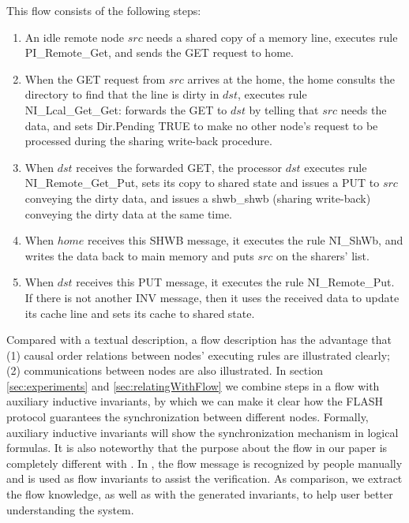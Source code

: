 \documentclass{llncs-new}
\newcommand{\lvyi}[1]{{\color{blue}#1}}
\begin{document}
This flow consists of the following steps:
\begin{enumerate}
\item An idle remote node $src$ needs a shared copy of a memory line, executes   rule PI\_Remote\_Get, and  sends the GET request to home.

\item  When the GET request from $src$ arrives at the
home, the home consults the directory to find that the line is dirty in $dst$,  executes rule NI\_Lcal\_Get\_Get: forwards the GET to $dst$ by telling that $src$ needs the data, and sets Dir.Pending TRUE to make no  other node's request to be processed during the sharing write-back procedure.

\item  When $dst$ receives the forwarded GET, the
processor $dst$ executes rule \\
NI\_Remote\_Get\_Put, sets its copy to shared state and issues a PUT to $src$ conveying the dirty data,  and  issues a   shwb\_shwb
 (sharing write-back) conveying the dirty data at the same time.

\item   When $home$ receives this SHWB message, it executes the rule NI\_ShWb, and
 writes the
data back  to main memory and puts $src$ on the sharers' list.

\item When $dst$ receives this PUT message, it executes the rule NI\_Remote\_Put. If there is not another INV message, then it   uses the received data to update its cache line and sets its cache to shared state.


\end{enumerate}

Compared with a textual description, a flow description has the advantage that (1) causal order relations between nodes' executing rules are illustrated clearly; (2) communications between nodes are also illustrated. In section \ref{sec:experiments} and \ref{sec:relatingWithFlow} we combine steps in a flow with auxiliary inductive invariants, by which we can make it clear  how the FLASH protocol guarantees the synchronization between different nodes. Formally, auxiliary inductive invariants will show    the synchronization mechanism in logical formulas. It is also noteworthy that the purpose about the flow in our paper is completely different with \cite{Talupur2008a}. In \cite{Talupur2008a}, the flow message is recognized by people manually and is used as flow invariants to assist the verification. As comparison, we extract the flow knowledge, as well as with the generated invariants, to help user better understanding the system.
\end{document}
